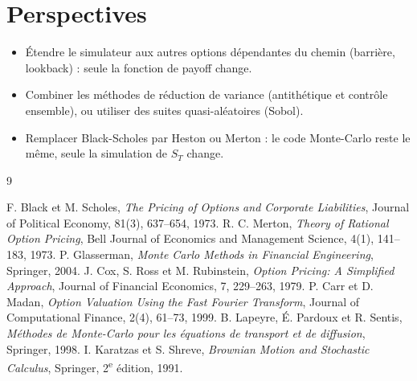 \section*{Perspectives}
\begin{itemize}[nosep]
\item Étendre le simulateur aux autres options dépendantes du chemin (barrière, lookback) : seule la fonction de payoff change.
\item Combiner les méthodes de réduction de variance (antithétique et contrôle ensemble), ou utiliser des suites quasi-aléatoires (Sobol).
\item Remplacer Black-Scholes par Heston ou Merton : le code Monte-Carlo reste le même, seule la simulation de $S_T$ change.
\end{itemize}

\begin{thebibliography}{9}
 F. Black et M. Scholes, \emph{The Pricing of Options and Corporate Liabilities}, Journal of Political Economy, 81(3), 637--654, 1973.
 R. C. Merton, \emph{Theory of Rational Option Pricing}, Bell Journal of Economics and Management Science, 4(1), 141--183, 1973.
 P. Glasserman, \emph{Monte Carlo Methods in Financial Engineering}, Springer, 2004.
 J. Cox, S. Ross et M. Rubinstein, \emph{Option Pricing: A Simplified Approach}, Journal of Financial Economics, 7, 229--263, 1979.
 P. Carr et D. Madan, \emph{Option Valuation Using the Fast Fourier Transform}, Journal of Computational Finance, 2(4), 61--73, 1999.
 B. Lapeyre, É. Pardoux et R. Sentis, \emph{Méthodes de Monte-Carlo pour les équations de transport et de diffusion}, Springer, 1998.
 I. Karatzas et S. Shreve, \emph{Brownian Motion and Stochastic Calculus}, Springer, 2\textsuperscript{e} édition, 1991.
\end{thebibliography}
